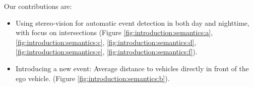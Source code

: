 Our contributions are:
\begin{itemize}
\item Using stereo-vision for automatic event detection in both day and nighttime, with focus on intersections (Figure \ref{fig:introduction:semantics:a}, \ref{fig:introduction:semantics:c}, \ref{fig:introduction:semantics:d}, \ref{fig:introduction:semantics:e}, \ref{fig:introduction:semantics:f}).
\item Introducing a new event: Average distance to vehicles directly in front of the ego vehicle. (Figure \ref{fig:introduction:semantics:b}).
\end{itemize}

\vspace{2pt}